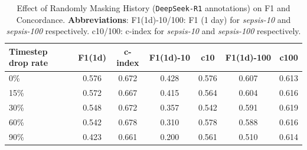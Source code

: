 \begin{table}[ht]
    \centering
    \begin{tabular}{lcccccc}
        \toprule
        \textbf{Timestep drop rate} & F1(1d) & c-index & F1(1d)-10 & c10 & F1(1d)-100 & c100 \\
        \hline
        0\%  & 0.576 & 0.672 & 0.428 & 0.576 & 0.607 & 0.613 \\
        15\% & 0.572 & 0.667 & 0.415 & 0.564 & 0.604 & 0.616 \\
        30\% & 0.548 & 0.672 & 0.357 & 0.542 & 0.591 & 0.619 \\
        60\% & 0.542 & 0.678 & 0.310 & 0.578 & 0.588 & 0.616 \\
        90\% & 0.423 & 0.661 & 0.200 & 0.561 & 0.510 & 0.614 \\
        \bottomrule
    \end{tabular}
    \caption{Effect of Randomly Masking History (\texttt{DeepSeek-R1} annotations) on F1 and Concordance. \textbf{Abbreviations}: F1(1d)-10/100: F1 (1 day) for \textit{sepsis-10} and \textit{sepsis-100} respectively. c10/100: c-index for \textit{sepsis-10} and \textit{sepsis-100} respectively.}
    \label{tab:masking_effects_DS}
\end{table}

\begin{table}[!hbpt]
    \centering
    \caption{Effect of Randomly Masking History (\texttt{Llama-3.3-70B} annotations) on F1 and Concordance. \textbf{Abbreviations}: F1(1d)-10/100: F1 (1 day) for \textit{sepsis-10} and \textit{sepsis-100} respectively. c10/100: c-index for \textit{sepsis-10} and \textit{sepsis-100} respectively.}
    \label{tab:masking_effects_llama}
\end{table}

